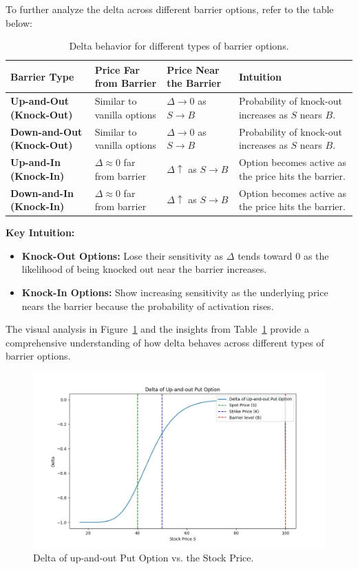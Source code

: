 To further analyze the delta across different barrier options, refer to the table below:
\begin{center}
	\begin{table}[H]
		\begin{tabular}{ | m{3cm} | m{5cm}| m{4cm} | m{4cm}|} 
			\hline
			\textbf{Barrier Type} & \textbf{Price Far from Barrier} & \textbf{Price Near the Barrier} & \textbf{Intuition}  \\
			\hline
			\textbf{Up-and-Out (Knock-Out)} & Similar to vanilla options     & $\Delta \to 0$ as $S \to B$  & Probability of knock-out increases as $S$ nears $B$. \\ 
			\hline
			\textbf{Down-and-Out (Knock-Out)} & Similar to vanilla options     & $\Delta \to 0$ as $S \to B$  & Probability of knock-out increases as $S$ nears $B$. \\ 
			\hline
			\textbf{Up-and-In (Knock-In)}    & $\Delta \approx 0$ far from barrier   & $\Delta \uparrow$ as $S \to B$  & Option becomes active as the price hits the barrier. \\ 
			\hline
			\textbf{Down-and-In (Knock-In)}  & $\Delta \approx 0$ far from barrier   & $\Delta \uparrow$ as $S \to B$  & Option becomes active as the price hits the barrier. \\ 
			\hline
		\end{tabular}
		\caption{Delta behavior for different types of barrier options.}
		\label{tab:delta_barrier_options}
	\end{table}
\end{center}
\textbf{Key Intuition:}
\begin{itemize}
    \item \textbf{Knock-Out Options:} Lose their sensitivity as $\Delta$ tends toward $0$ as the likelihood of being knocked out near the barrier increases.
    \item \textbf{Knock-In Options:} Show increasing sensitivity as the underlying price nears the barrier because the probability of activation rises.
\end{itemize}

The visual analysis in Figure~\ref{fig:delta_upout} and the insights from Table~\ref{tab:delta_barrier_options} provide a comprehensive understanding of how delta behaves across different types of barrier options.
\begin{figure}[H]
    \centering
    \includegraphics[width=.65\linewidth]{content/images/delta_upout.png}
    \caption{Delta of up-and-out Put Option vs. the Stock Price.}
    \label{fig:delta_upout}
\end{figure}

